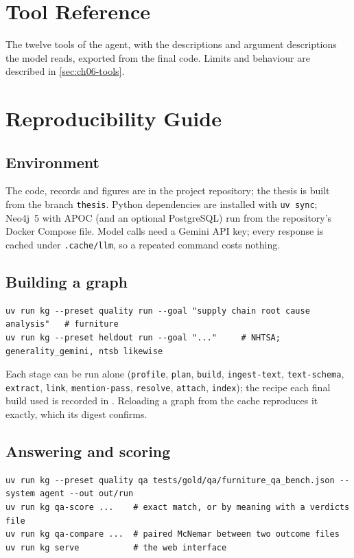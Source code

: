 \chapter{Tool Reference}\label{app:tool-reference}

The twelve tools of the agent, with the descriptions and argument descriptions the model reads, exported from the
final code. Limits and behaviour are described in \cref{sec:ch06-tools}.



\chapter{Reproducibility Guide}\label{app:reproducibility-guide}

\section*{Environment}
The code, records and figures are in the project repository; the thesis is built from the branch \texttt{thesis}.
Python dependencies are installed with \texttt{uv sync}; Neo4j~5 with APOC (and an optional PostgreSQL) run from the
repository's Docker Compose file. Model calls need a Gemini API key; every response is cached under
\texttt{.cache/llm}, so a repeated command costs nothing.

\section*{Building a graph}
\begin{lstlisting}
uv run kg --preset quality run --goal "supply chain root cause analysis"   # furniture
uv run kg --preset heldout run --goal "..."     # NHTSA; generality_gemini, ntsb likewise
\end{lstlisting}
Each stage can be run alone (\texttt{profile}, \texttt{plan}, \texttt{build}, \texttt{ingest-text},
\texttt{text-schema}, \texttt{extract}, \texttt{link}, \texttt{mention-pass}, \texttt{resolve}, \texttt{attach},
\texttt{index}); the recipe each final build used is recorded in . Reloading a
graph from the cache reproduces it exactly, which its digest confirms.

\section*{Answering and scoring}
\begin{lstlisting}
uv run kg --preset quality qa tests/gold/qa/furniture_qa_bench.json --system agent --out out/run
uv run kg qa-score ...    # exact match, or by meaning with a verdicts file
uv run kg qa-compare ...  # paired McNemar between two outcome files
uv run kg serve           # the web interface
\end{lstlisting}

